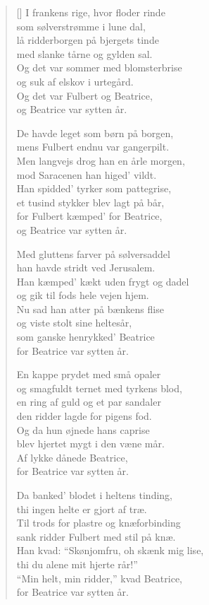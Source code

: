 \begin{multicols}{2}
\settowidth{\versewidth}{Men langvejs drog han en årle morgen,}
\begin{verse}[\versewidth]
I frankens rige, hvor floder rinde\\
som sølverstrømme i lune dal,\\
lå ridderborgen på bjergets tinde\\
med slanke tårne og gylden sal.\\
Og det var sommer med blomsterbrise\\
og suk af elskov i urtegård.\\
Og det var Fulbert og Beatrice,\\
og Beatrice var sytten år.

De havde leget som børn på borgen,\\
mens Fulbert endnu var gangerpilt.\\
Men langvejs drog han en årle morgen,\\
mod Saracenen han higed' vildt.\\
Han spidded' tyrker som pattegrise,\\
et tusind stykker blev lagt på bår,\\
for Fulbert kæmped' for Beatrice,\\
og Beatrice var sytten år.

Med gluttens farver på sølversaddel\\
han havde stridt ved Jerusalem.\\
Han kæmped' kækt uden frygt og dadel\\
og gik til fods hele vejen hjem.\\
Nu sad han atter på bænkens flise\\
og viste stolt sine heltesår,\\
som ganske henrykked' Beatrice\\
for Beatrice var sytten år.

En kappe prydet med små opaler\\
og smagfuldt ternet med tyrkens blod,\\
en ring af guld og et par sandaler\\
den ridder lagde for pigens fod.\\
Og da hun øjnede hans caprise\\
blev hjertet mygt i den væne mår.\\
Af lykke dånede Beatrice,\\
for Beatrice var sytten år.

\columnbreak
Da banked' blodet i heltens tinding,\\
thi ingen helte er gjort af træ.\\
Til trods for plastre og knæforbinding\\
sank ridder Fulbert med stil på knæ.\\
Han kvad: ``Skønjomfru, oh skænk mig lise,\\
thi du alene mit hjerte rår!''\\
``Min helt, min ridder,'' kvad Beatrice,\\
for Beatrice var sytten år.


\end{verse}
\end{multicols}
